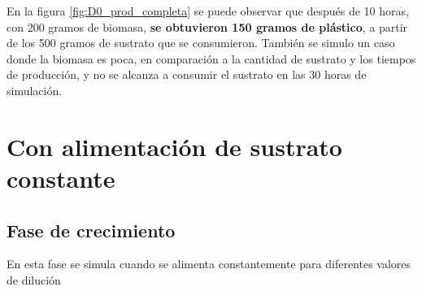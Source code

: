 \documentclass[letterpaper, 10 pt, conference]{ieeeconf}  %
\begin{document}
En la figura \ref{fig:D0_prod_completa} se puede observar que después de 10 horas, con 200 gramos de biomasa, \textbf{se obtuvieron 150 gramos de plástico}, a partir de los 500 gramos de sustrato que se consumieron. También se simulo un caso donde la biomasa es poca, en comparación a la cantidad de sustrato y los tiempos de producción, y no se alcanza a consumir el sustrato en las 30 horas de simulación.

\section{Con alimentación de sustrato constante}

\subsection{Fase de crecimiento}

En esta fase se simula cuando se alimenta constantemente para diferentes valores de dilución
\end{document}
